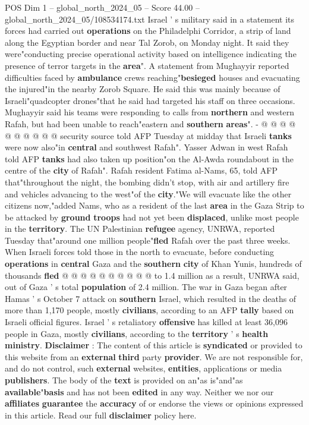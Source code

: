 \begin{textsample}{POS Dim 1 – global\_north\_2024\_05 – Score 44.00 – global\_north\_2024\_05/108534174.txt}
Israel ' s military said in a statement its forces had carried out \textbf{operations} on the Philadelphi Corridor, a strip of land along the Egyptian border and near Tal Zorob, on Monday night.
It said they were"conducting precise operational activity based on intelligence indicating the presence of terror targets in the \textbf{area}".
A statement from Mughayyir reported difficulties faced by \textbf{ambulance} crews reaching"\textbf{besieged} houses and evacuating the injured"in the nearby Zorob Square.
He said this was mainly because of Israeli"quadcopter drones"that he said had targeted his staff on three occasions.
Mughayyir said his teams were responding to calls from \textbf{northern} and western Rafah, but had been unable to reach"eastern and \textbf{southern} \textbf{areas}". - @ @ @ @ @ @ @ @ @ @ security source told AFP Tuesday at midday that Israeli \textbf{tanks} were now also"in \textbf{central} and southwest Rafah".
Yasser Adwan in west Rafah told AFP \textbf{tanks} had also taken up position"on the Al-Awda roundabout in the centre of the \textbf{city} of Rafah".
Rafah resident Fatima al-Nams, 65, told AFP that"throughout the night, the bombing didn't stop, with air and artillery fire and vehicles advancing to the west"of the \textbf{city}."We will evacuate like the other citizens now,"added Nams, who as a resident of the last \textbf{area} in the Gaza Strip to be attacked by \textbf{ground} \textbf{troops} had not yet been \textbf{displaced}, unlike most people in the \textbf{territory}.
The UN Palestinian \textbf{refugee} agency, UNRWA, reported Tuesday that"around one million people"\textbf{fled} Rafah over the past three weeks.
When Israeli forces told those in the north to evacuate, before conducting \textbf{operations} in \textbf{central} Gaza and the \textbf{southern} \textbf{city} of Khan Yunis, hundreds of thousands \textbf{fled} @ @ @ @ @ @ @ @ @ @ to 1.4 million as a result, UNRWA said, out of Gaza ' s total \textbf{population} of 2.4 million.
The war in Gaza began after Hamas ' s October 7 attack on \textbf{southern} Israel, which resulted in the deaths of more than 1,170 people, mostly \textbf{civilians}, according to an AFP \textbf{tally} based on Israeli official figures.
Israel ' s retaliatory \textbf{offensive} has killed at least 36,096 people in Gaza, mostly \textbf{civilians}, according to the \textbf{territory} ' s \textbf{health} \textbf{ministry}. \textbf{Disclaimer} : The content of this article is \textbf{syndicated} or provided to this website from an \textbf{external} \textbf{third} party \textbf{provider}.
We are not responsible for, and do not control, such \textbf{external} websites, \textbf{entities}, applications or media \textbf{publishers}.
The body of the \textbf{text} is provided on an"as is"and"as \textbf{available}"\textbf{basis} and has not been \textbf{edited} in any way.
Neither we nor our \textbf{affiliates} \textbf{guarantee} the \textbf{accuracy} of or endorse the views or opinions expressed in this article.
Read our full \textbf{disclaimer} policy here.


\end{textsample}
